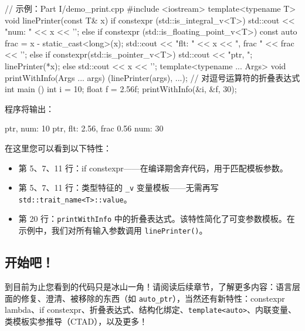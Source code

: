 \begin{codebox}[cpp]
// 示例：Part I/demo_print.cpp
#include <iostream>
template<typename T> void linePrinter(const T& x)
{
if constexpr (std::is_integral_v<T>)
std::cout << "num: " << x << '\n';
else if constexpr (std::is_floating_point_v<T>) {
const auto frac = x - static_cast<long>(x);
std::cout << "flt: " << x << ", frac " << frac << '\n';
}
else if constexpr(std::is_pointer_v<T>) {
std::cout << "ptr, ";
linePrinter(*x);
}
else
std::cout << x << '\n';
}
template<typename ... Args> void printWithInfo(Args ... args) {
(linePrinter(args), ...); // 对逗号运算符的折叠表达式
}
int main () {
int i = 10;
float f = 2.56f;
printWithInfo(&i, &f, 30);
}
\end{codebox}

程序将输出：

\begin{codebox}[cpp]
ptr, num: 10
ptr, flt: 2.56, frac 0.56
num: 30
\end{codebox}

在这里您可以看到以下特性：

\begin{itemize}
\item 第 5、7、11 行：if constexpr——在编译期舍弃代码，用于匹配模板参数。
\item 第 5、7、11 行：类型特征的 \texttt{\_v} 变量模板——无需再写 \texttt{std::trait\_name<T>::value}。
\item 第 20 行：\texttt{printWithInfo} 中的折叠表达式。该特性简化了可变参数模板。在示例中，我们对所有输入参数调用 \texttt{linePrinter()}。
\end{itemize}

\subsection{开始吧！}

到目前为止您看到的代码只是冰山一角！请阅读后续章节，了解更多内容：语言层面的修复、澄清、被移除的东西（如 \texttt{auto\_ptr}），当然还有新特性：constexpr lambda、if constexpr、折叠表达式、结构化绑定、\texttt{template<auto>}、内联变量、类模板实参推导（CTAD），以及更多！

